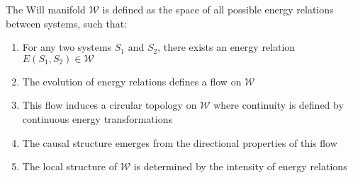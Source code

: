\documentclass{article}
\begin{document}
\begin{theorem}
The Will manifold $\mathcal{W}$ is defined as the space of all possible energy relations between systems, such that:
\begin{enumerate}
    \item For any two systems $S_1$ and $S_2$, there exists an energy relation $E(S_1, S_2) \in \mathcal{W}$
    \item The evolution of energy relations defines a flow on $\mathcal{W}$
    \item This flow induces a circular topology on $\mathcal{W}$ where continuity is defined by continuous energy transformations
    \item The causal structure emerges from the directional properties of this flow
    \item The local structure of $\mathcal{W}$ is determined by the intensity of energy relations
    \end{enumerate}
\end{theorem}
\end{document}
